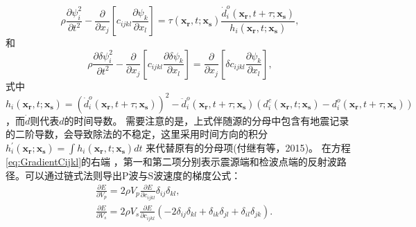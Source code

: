 \begin{equation}
    \rho \frac{\partial \psi^2_i}{\partial t^2}  -
    \frac{\partial}{\partial x_j}\left[ 
        c_{ijkl}\frac{\partial \psi_{k}}{\partial
        x_l}\right]=\tau(\mathbf{x_r},t;\mathbf{x_s})\frac{\dot{d}^o_i(\mathbf{x_r},t+\tau;\mathbf{x_s})}{h_i(\mathbf{x_r},t;\mathbf{x_s})},
    \label{eq:AdjointWE} 
\end{equation}
和
\begin{equation}
    \rho \frac{\partial \delta \psi^2_i}{\partial t^2}  -
    \frac{\partial}{\partial x_j}\left[ 
        c_{ijkl}\frac{\partial \delta \psi_{k}}{\partial 
        x_l}\right]=\frac{\partial}{\partial x_j}\left[\delta c_{ijkl}\frac{\partial
        \psi_{k}}{\partial x_l}\right], 
    \label{eq:AdjointDeltaWE} 
\end{equation}
式中$h_i(\mathbf{x_r},t;\mathbf{x_s})=(\dot{d}^o_i(\mathbf{x_r},t+\tau;\mathbf{x_s}))^2-\ddot{d}^o_i(\mathbf{x_r},t+\tau;\mathbf{x_s})
(d^c_i(\mathbf{x_r},t;\mathbf{x_s})-d^o_i(\mathbf{x_r},t+\tau;\mathbf{x_s}))$，而$\dot{d}$则代表$d$的时间导数。
需要注意的是，上式伴随源的分母中包含有地震记录的二阶导数，会导致除法的不稳定，这里采用时间方向的积分
$h^{'}_i(\mathbf{x_r};\mathbf{x_s})=\int h_i(\mathbf{x_r},t;\mathbf{x_s})dt$
来代替原有的分母项(付继有等，2015\cite{Fu2015})。
在方程\eqref{eq:GradientCijkl}的右端
，第一和第二项分别表示震源端和检波点端的反射波路径。可以通过链式法则导出P波与S波速度的梯度公式：
\begin{equation}
\begin{split}
    &\frac{\partial E}{\partial V_p}=2\rho V_p\frac{\partial E}{\partial
        c_{ijkl}}\delta_{ij}\delta_{kl}, \\
    &\frac{\partial E}{\partial V_s}=2\rho V_s\frac{\partial
    E}{\partial c_{ijkl}}(-2\delta_{ij}\delta_{kl}+\delta_{ik}\delta_{jl}+
    \delta_{il}\delta_{jk}).
\end{split}
    \label{eq:GradientVel}
\end{equation}


